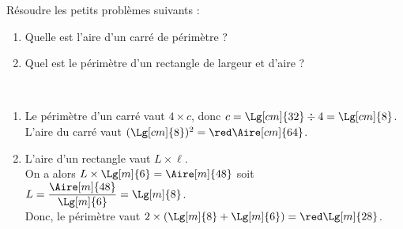 \begin{exercice*} %
   Résoudre les petits problèmes suivants :
   \begin{enumerate}
      \item Quelle est l'aire d'un carré de périmètre  ?
      \item Quel est le périmètre d'un rectangle de largeur  et d'aire  ?
   \end{enumerate}
\end{exercice*}

\begin{corrige}
   \ \\ [-5mm]
   \begin{enumerate}
      \item Le périmètre d'un carré vaut $4\times c$, donc $c =\Lg[cm]{32}\div4 =\Lg[cm]{8}$. \\
         L'aire du carré vaut $(\Lg[cm]{8})^2 =\red\Aire[cm]{64}$.
      \item L'aire d'un rectangle vaut $L\times\ell$. \\
         On a alors $L\times\Lg[m]{6} =\Aire[m]{48}$ soit $L =\dfrac{\Aire[m]{48}}{\Lg[m]{6}} =\Lg[m]{8}$. \\ [1mm]
         Donc, le périmètre vaut $2\times(\Lg[m]{8}+\Lg[m]{6}) =\red\Lg[m]{28}$.
   \end{enumerate}
\end{corrige}
